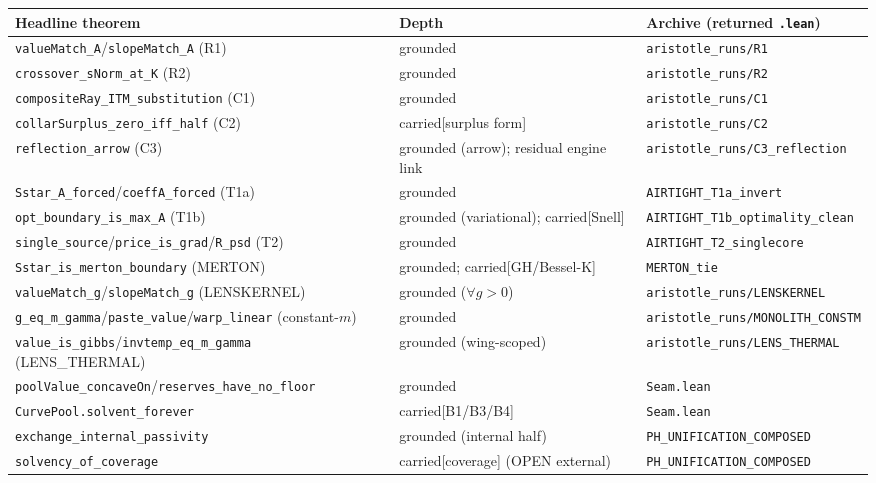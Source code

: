 \documentclass[runningheads]{llncs}
\begin{document}
\begin{center}
\footnotesize
\setlength{\tabcolsep}{4pt}
\begin{tabularx}{\textwidth}{@{}>{\raggedright\arraybackslash}X >{\raggedright\arraybackslash}p{2.6cm} >{\raggedright\arraybackslash}X@{}}
\toprule
Headline theorem & Depth & Archive (returned \texttt{.lean}) \\
\midrule
\texttt{valueMatch\_A}/\texttt{slopeMatch\_A} (R1) & grounded & \texttt{aristotle\_runs/R1} \\
\texttt{crossover\_sNorm\_at\_K} (R2) & grounded & \texttt{aristotle\_runs/R2} \\
\texttt{compositeRay\_ITM\_substitution} (C1) & grounded & \texttt{aristotle\_runs/C1} \\
\texttt{collarSurplus\_zero\_iff\_half} (C2) & carried[surplus form] & \texttt{aristotle\_runs/C2} \\
\texttt{reflection\_arrow} (C3) & grounded (arrow); residual engine link & \texttt{aristotle\_runs/C3\_reflection} \\
\texttt{Sstar\_A\_forced}/\texttt{coeffA\_forced} (T1a) & grounded & \texttt{AIRTIGHT\_T1a\_invert} \\
\texttt{opt\_boundary\_is\_max\_A} (T1b) & grounded (variational); carried[Snell] & \texttt{AIRTIGHT\_T1b\_optimality\_clean} \\
\texttt{single\_source}/\texttt{price\_is\_grad}/\texttt{R\_psd} (T2) & grounded & \texttt{AIRTIGHT\_T2\_singlecore} \\
\texttt{Sstar\_is\_merton\_boundary} (MERTON) & grounded; carried[GH/Bessel-K] & \texttt{MERTON\_tie} \\
\texttt{valueMatch\_g}/\texttt{slopeMatch\_g} (LENSKERNEL) & grounded ($\forall g>0$) & \texttt{aristotle\_runs/LENSKERNEL} \\
\texttt{g\_eq\_m\_gamma}/\texttt{paste\_value}/\texttt{warp\_linear} (constant-$m$) & grounded & \texttt{aristotle\_runs/MONOLITH\_CONSTM} \\
\texttt{value\_is\_gibbs}/\texttt{invtemp\_eq\_m\_gamma} (LENS\_THERMAL) & grounded (wing-scoped) & \texttt{aristotle\_runs/LENS\_THERMAL} \\
\texttt{poolValue\_concaveOn}/\texttt{reserves\_have\_no\_floor} & grounded & \texttt{Seam.lean} \\
\texttt{CurvePool.solvent\_forever} & carried[B1/B3/B4] & \texttt{Seam.lean} \\
\texttt{exchange\_internal\_passivity} & grounded (internal half) & \texttt{PH\_UNIFICATION\_COMPOSED} \\
\texttt{solvency\_of\_coverage} & carried[coverage] (OPEN external) & \texttt{PH\_UNIFICATION\_COMPOSED} \\
\bottomrule
\end{tabularx}
\end{center}
\end{document}
